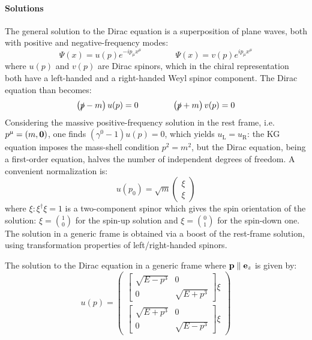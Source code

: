 \paragraph{Solutions}

The general solution to the Dirac equation is a superposition of plane waves, both with positive and negative-frequency modes:
\begin{equation*}
  \Psi(x) = u(p) e^{-i p_\mu x^\mu}
  \qquad \qquad
  \Psi(x) = v(p) e^{i p_\mu x^\mu}
\end{equation*}
where $ u(p) $ and $ v(p) $ are Dirac spinors, which in the chiral representation both have a left-handed and a right-handed Weyl spinor component. The Dirac equation than becomes:
\begin{equation*}
  \left( \slashed{p} - m \right) u(p) = 0
  \qquad \qquad
  \left( \slashed{p} + m \right) v(p) = 0
\end{equation*}
Considering the massive positive-frequency solution in the rest frame, i.e. $ p^\mu = (m, \mathbf{0}) $, one finds $ (\gamma^0 - 1) u(p) = 0 $, which yields $ u_\text{L} = u_\text{R} $: the KG equation imposes the mass-shell condition $ p^2 = m^2 $, but the Dirac equation, being a first-order equation, halves the number of independent degrees of freedom. A convenient normalization is:
\begin{equation*}
  u(p_0) = \sqrt{m}
  \begin{pmatrix}
    \xi \\ \xi
  \end{pmatrix}
\end{equation*}
where $ \xi : \xi^\dagger \xi = 1 $ is a two-component spinor which gives the spin orientation of the solution: $ \xi = \binom{1}{0} $ for the spin-up solution and $ \xi = \binom{0}{1} $ for the spin-down one.\\
The solution in a generic frame is obtained via a boost of the rest-frame solution, using transformation properties of left/right-handed spinors.

\begin{proposition}{}{}
  The solution to the Dirac equation in a generic frame where $ \mathbf{p} \parallel \mathbf{e}_z $ is given by:
  \begin{equation}
    u(p) =
    \begin{pmatrix}
      \begin{bmatrix}
        \sqrt{E - p^3} & 0 \\ 0 & \sqrt{E + p^3}
      \end{bmatrix} \xi \\
      \begin{bmatrix}
        \sqrt{E + p^3} & 0 \\ 0 & \sqrt{E - p^3}
      \end{bmatrix} \xi
    \end{pmatrix}
    \label{eq:u-spinor-p3-frame}
  \end{equation}
\end{proposition}

